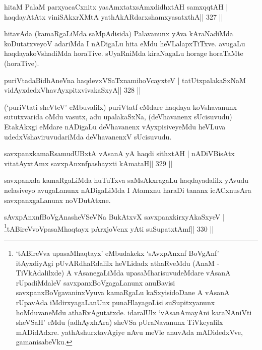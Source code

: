 
\begin{shl}
hitaM PalaM parxyacaCxnitx yasAmxtatxsAmxdidhxtAH samxqqtAH |
haqdayAtAtx viniSAkxrXMtA yathA\s kARdarxshamxyasatxthA\hfill || 327 ||
\end{shl}

\begin{artha}
hitavAda (kamaRgaLiMda saMpAdisida) Palavanunx yAva kAraNadiMda 
koDutatxveyoV adariMda I nADigaLu hita eMdu heVLalapxTiTxve. avugaLu 
haqdayakoVshadiMda horaTive. sUyaRniMda kiraNagaLu horage horaTaMte 
(horaTive). 
\end{artha}


\begin{shl}
puriVtadaBidhAneVna haqdevxVSaTxnamihoVcayxteV |
tatUtxpalakaSxNaM vidAyxdedxVhavAyxpitxvivakaSxyA\hfill || 328 ||
\end{shl}

\begin{artha}
(`puriVtati sheVteV' eMbuvalilx) puriVtatf eMdare haqdaya koVshavanunx 
sututxvarida oMdu vasutx, adu upalakaSxNa, (deVhavanenx sUcisuvudu) EtakAkxgi eMdare nADigaLu deVhavanenx vAyxpisiveyeMdu heVLuva udedxVshaviruvudariMda deVhavanenxV sUcisuvudu.
\end{artha}

\begin{shl}
savxpanxkamaRsamudUBxtA vAsanA yA haqdi sithxtAH |
nADiVBisAtx vitatAyx\s\s tAmx savxpAnxnfpashayxti  kAmataH\hfill || 329 ||
\end{shl}

\begin{artha}
savxpanxda kamaRgaLiMda huTuTxva saMsAkxragaLu haqdayadalilx yAvudu nelasiveyo avugaLanunx nADigaLiMda I Atamxnu haraDi tananx icACxnusAra savxpanxgaLanunx noVDutAtxne.
\end{artha}


\begin{shl}
sAvxpAnxnfBoVgAnasheVSeVNa BukAtxvX savxpanxkirxyAkaSxyeV |
\footnote{`tABireVva upasaMhaqtayx' eMbudakekx `sAvxpAnxnf 
BoVgAnf' itAyxdiyAgi pUvARdhaRdalilx heVLidadx athaRveMdu (AnaM - 
TiVkAdalilxde) A vAsanegaLiMda upasaMharisuvudeMdare vAsanA 
rUpadiMdaleV savxpanxBoVgagaLanunx anuBavisi savxpanxBoVgavaninxVyuva 
kamaRgaLu kaSxyisidoDane A vAsanA rUpavAda iMdirxyagaLanUnx 
punaHlayagoLisi suSupitxyanunx hoMduvaneMdu athaRvAgutatxde. idaralUlx 
`vAsanAmayAni karaNAniVti sheVSaH' eMdu (adhAyxhAra) sheVSa pUraNavanunx TiVkeyalilx mADidAdxre. yathAshurxtavAgiye nAvu meVle anuvAda mADidedxVve, gamanisabeVku.}tABireVvoVpasaMhaqtayx pArxjoVcnx yAti suSupatxtAmf\hfill || 330 ||
\end{shl}


